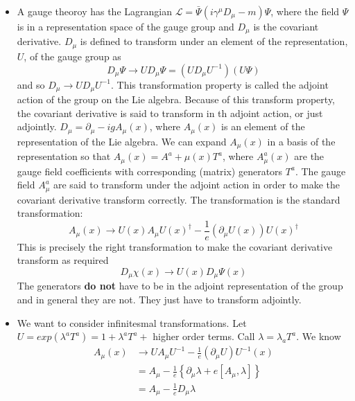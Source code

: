 \begin{itemize}
  \item A gauge theoroy has the Lagrangian
    $\mathcal{L}=\bar{\Psi}\left(i\gamma^\mu D_\mu -m\right)\Psi$, where the
    field $\Psi$ is in a representation space of the gauge group and $D_\mu$ is
    the covariant derivative. $D_\mu$ is defined to transform under an element
    of the representation, $U$, of the gauge group as
    \begin{equation}
      D_\mu\Psi\rightarrow U D_\mu \Psi = (U D_\mu U^{-1})(U\Psi)
    \end{equation}
    and so $D_\mu\rightarrow U D_\mu U^{-1}$. This transformation property is
    called the adjoint action of the group on the Lie algebra. Because of
    this transform property, the covariant derivative is said to transform
    in th adjoint action, or just adjointly. $D_\mu=\partial_\mu - igA_\mu(x)$,
    where $A_\mu(x)$ is an element of the representation of the Lie algebra. We
    can expand $A_\mu(x)$ in a basis of the representation so that $A_\mu(x)
    = A^a+\mu(x)T^a$, where $A^a_\mu(x)$ are the gauge field coefficients with
    corresponding (matrix) generators $T^a$. The gauge field $A^a_\mu$ are said
    to transform under the adjoint action in order to make the covariant 
    derivative transform correctly. The transformation is the standard
    transformation:
    \begin{equation}
      A_\mu(x)\rightarrow U(x) A_\mu U(x)^\dagger - \frac{1}{e}(\partial_\mu
      U(x))U(x)^\dagger 
    \end{equation}
    This is precisely the right transformation to make the covariant derivative
    transform as required
    \begin{equation}
      D_{\mu}\chi(x)\rightarrow U(x)D_\mu \Psi(x)
    \end{equation}
    The generators \textbf{do not} have to be  in the adjoint representation of
    the group and in general they are not. They just have to transform
    adjointly.
  \item We want to consider infinitesmal transformations. Let $U=exp(\lambda^a
    T^a) = 1+ \lambda^a T^a +$ higher order terms. Call $\lambda = \lambda_a
    T^a$. We know
    \begin{align}
      A_\mu(x) &\rightarrow UA_\mu U^{-1} - \frac{1}{e}(\partial_\mu
      U)U^{-1}(x)\\
      &= A_\mu - \frac{1}{e}\left\{\partial_\mu\lambda + e\left[A_\mu,
  \lambda\right]\right\}\\
      &= A_\mu - \frac{1}{e}D_\mu\lambda
\end{align}

\end{itemize}
